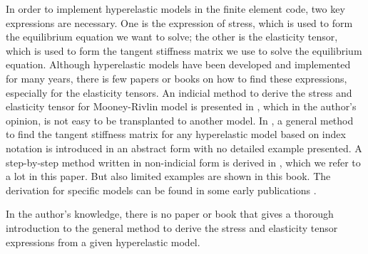 In order to implement hyperelastic models in the finite element code, two key expressions are necessary. One is the expression of stress, which is used to form the equilibrium equation we want to solve; the other is the elasticity tensor, which is used to form the tangent stiffness matrix we use to solve the equilibrium equation.  Although hyperelastic models have been developed and implemented for many years, there is few papers or books on how to find these expressions, especially for the elasticity tensors.  An indicial method to derive the stress and elasticity tensor for Mooney-Rivlin model is presented in \cite{Bower}, which in the author's opinion, is not easy to be transplanted to another model. In \cite{Belytschko}, a general method to find the tangent stiffness matrix for any hyperelastic model based on index notation is introduced in an abstract form with no detailed example presented. A step-by-step method written in non-indicial form is derived in \cite{Holzapfel}, which we refer to a lot in this paper. But also limited examples are shown in this book. The derivation for specific models can be found in some early publications \cite{Weiss, Nicholson}.


In the author's knowledge, there is no paper or book that gives a thorough introduction to the general method to derive the stress and elasticity tensor expressions from a given hyperelastic model. 


